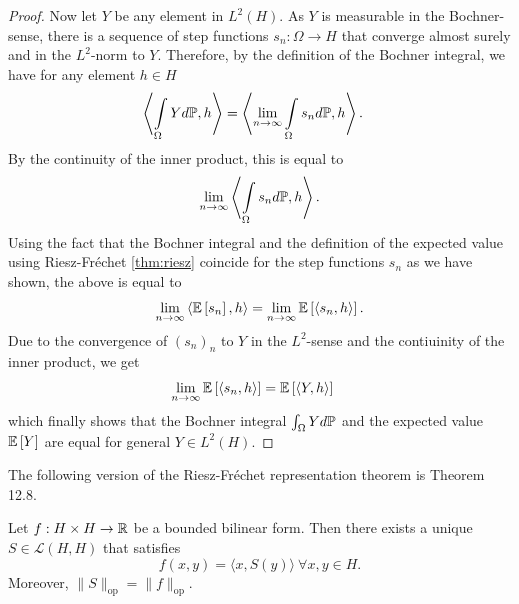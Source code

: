 \begin{proof}
    Now let $Y$ be any element in $L^2(H)$. As $Y$ is measurable in the Bochner-sense, there is a sequence of step functions $s_n: \Omega \to H$ that converge almost surely and in the $L^2$-norm to $Y$. Therefore, by the definition of the Bochner integral, we have for any element $h \in H$
    \begin{align*}
        \left\langle \int\limits_\Omega Y d\mathbb{P}, h \right\rangle
        & = \left\langle \lim\limits_{n \to \infty} \int\limits_\Omega s_n d\mathbb{P}, h \right\rangle.
    \end{align*}
    By the continuity of the inner product, this is equal to
    \begin{align*}
        \lim\limits_{n \to \infty} \left\langle \int\limits_\Omega s_n d\mathbb{P}, h \right\rangle.
    \end{align*}
    Using the fact that the Bochner integral and the definition of the expected value using Riesz-Fréchet \ref{thm:riesz} coincide for the step functions $s_n$ as we have shown, the above is equal to
    \begin{align*}
        \lim\limits_{n \to \infty} \left\langle \mathbb{E}\left[s_n\right], h \right\rangle = \lim\limits_{n \to \infty} \mathbb{E}\left[\left\langle s_n, h \right\rangle\right].
    \end{align*}
    Due to the convergence of $(s_n)_n$ to $Y$ in the $L^2$-sense and the contiuinity of the inner product, we get
    \begin{align*}
        \lim\limits_{n \to \infty} \mathbb{E}\left[\left\langle s_n, h \right\rangle\right]
        & = \mathbb{E}\left[\left\langle Y, h \right\rangle\right]
    \end{align*}
    which finally shows that the Bochner integral $\int_\Omega Y d\mathbb{P}$ and the expected value $\mathbb{E}\left[Y\right]$ are equal for general $Y \in L^2(H)$.
\end{proof}


The following version of the Riesz-Fréchet representation theorem is \cite{rudin1991functionalanalysis} Theorem 12.8.
\begin{thm} \label{thm: Riesz bilinear}
    Let $f: H \times H \to \mathbb{R}$ be a bounded bilinear form. Then there exists a unique $S \in \mathcal{L}(H, H)$ that satisfies
    \[ f(x, y) = \langle x, S(y) \rangle \ \forall x, y \in H. \]
    Moreover, $\| S \|_{\mathrm{op}} = \| f \|_{\mathrm{op}}$.
\end{thm}

